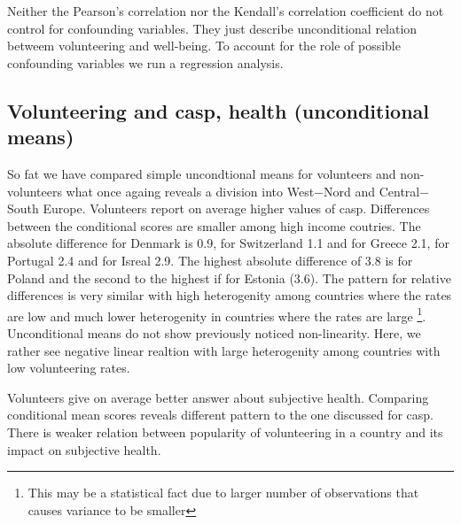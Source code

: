 \documentclass[10pt, letterpaper]{article}
\begin{document}
\begin{spacing}{1.4}
Neither the Pearson's correlation nor the Kendall's correlation coefficient  do not control for confounding variables. They just describe unconditional relation betweem volunteering and well-being. To account for the role of possible confounding variables we run a regression analysis.   

\subsection*{Volunteering and casp, health (unconditional means)}

So fat we have compared simple uncondtional means for volunteers and non-volunteers what once againg reveals a division into West$-$Nord and Central$-$South Europe. Volunteers report on average higher values of casp. Differences between the conditional scores are smaller among  high income coutries. The absolute difference for Denmark  is 0.9, for Switzerland 1.1 and for Greece 2.1, for Portugal 2.4 and for Isreal 2.9. The highest absolute difference of 3.8 is for Poland and the second to the highest if for Estonia (3.6). The pattern for relative differences is very similar with high heterogenity among countries where the rates are low and much lower heterogenity in countries where the rates are large \footnote{This may be a statistical fact due to larger number of observations that causes variance to be smaller}. 
Unconditional means do not show previously noticed non-linearity. Here, we rather see negative linear realtion with large heterogenity among countries with low volunteering rates.

Volunteers give on average better answer about subjective health. Comparing conditional mean scores reveals different pattern to the one discussed for casp. There is weaker relation between popularity of volunteering in a country and its impact on subjective health. 



\end{spacing}
\end{document}
